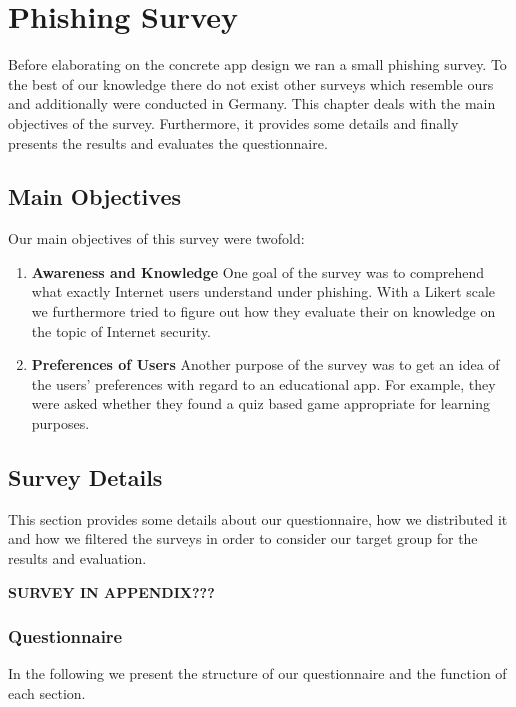 \section{Phishing Survey}
\label{s:prestudy}
Before elaborating on the concrete app design we ran a small phishing survey.
 To the best of our knowledge there do not exist other surveys which resemble ours and additionally were conducted in Germany.
 This chapter deals with the main objectives of the survey.
 Furthermore, it provides some details and finally presents the results and evaluates the questionnaire.


\subsection{Main Objectives}
Our main objectives of this survey were twofold:

\begin{enumerate}
	\item \textbf{Awareness and Knowledge} One goal of the survey was to comprehend what exactly Internet users understand under phishing.
 With a Likert scale we furthermore tried to figure out how they evaluate their on knowledge on the topic of Internet security.

	\item \textbf{Preferences of Users} Another purpose of the survey was to get an idea of the users' preferences with regard to an educational app.
 For example, they were asked whether they found a quiz based game appropriate for learning purposes.

\end{enumerate}
\subsection{Survey Details}
This section provides some details about our questionnaire, how we distributed it and how we filtered the surveys in order to consider our target group for the results and evaluation.

\textbf{SURVEY IN APPENDIX???}

\subsubsection{Questionnaire}
In the following we present the structure of our questionnaire and the function of each section.
 
